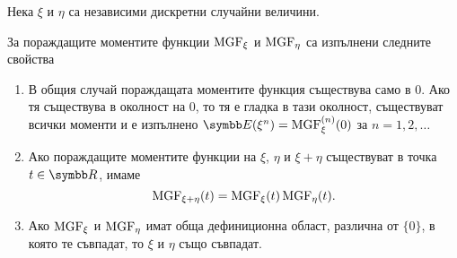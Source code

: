 \documentclass[numbers=endperiod, bibliography=totocnumbered]{scrartcl}
\begin{document}
\begin{theorem}\label{thm:mgf_properties}
  Нека \( \xi \) и \( \eta \) са независими дискретни случайни величини.

  За пораждащите моментите функции \( \operatorname{MGF}_\xi \) и \( \operatorname{MGF}_\eta \) са изпълнени следните свойства
  \begin{enumerate}
    \item В общия случай пораждащата моментите функция съществува само в \( 0 \). Ако тя съществува в околност на \( 0 \), то тя е гладка в тази околност, съществуват всички моменти и е изпълнено \( \Expect(\xi^n) = \MGF_\xi^{(n)} (0) \) за \( n = 1, 2, \ldots \)

    \item Ако пораждащите моментите функции на \( \xi \), \( \eta \) и \( \xi + \eta \) съществуват в точка \( t \in \R \), имаме
    \begin{equation*}
      \operatorname{MGF}_{\xi + \eta}(t) = \operatorname{MGF}_\xi(t) \operatorname{MGF}_\eta(t).
    \end{equation*}

    \item Ако \( \operatorname{MGF}_\xi \) и \( \operatorname{MGF}_\eta \) имат обща дефиниционна област, различна от \( \{ 0 \} \), в която те съвпадат, то \( \xi \) и \( \eta \) също съвпадат.
  \end{enumerate}
\end{theorem}
\end{document}
